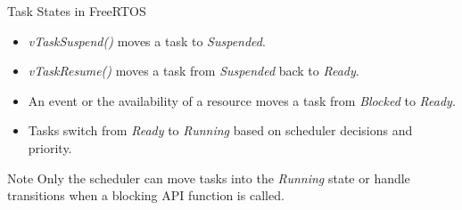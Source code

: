 \documentclass[10pt]{beamer}
\begin{document}
\begin{frame}{Task States in FreeRTOS}
  \begin{itemize}
    \item \textit{vTaskSuspend()} moves a task to \textit{Suspended}.
    \item \textit{vTaskResume()} moves a task from \textit{Suspended} back to \textit{Ready}.
    \item An event or the availability of a resource moves a task from \textit{Blocked} to \textit{Ready}.
    \item Tasks switch from \textit{Ready} to \textit{Running} based on scheduler decisions and priority.
  \end{itemize}
  \begin{block}{Note}
    Only the scheduler can move tasks into the \textit{Running} state or handle transitions when a blocking API function is called.
  \end{block}
\end{frame}
\end{document}
